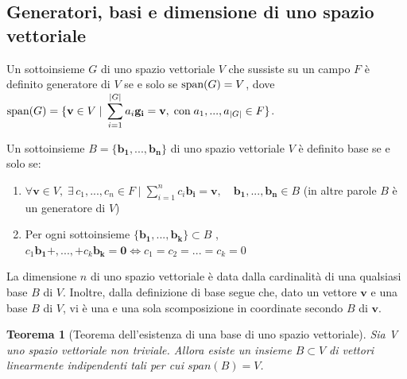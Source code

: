 \documentclass{article}
\newtheorem{theorem}{Teorema}
\begin{document}
\vspace{10pt}
\subsection{Generatori, basi e dimensione di uno spazio vettoriale}
    Un sottoinsieme $G$ di uno spazio vettoriale $V$ che sussiste su un campo $F$ è definito generatore di $V$ se e solo se $\textnormal{span}(G) = V$, dove $\textnormal{span}(G) = \{\mathbf{v} \in V \; | \; \displaystyle\sum_{i = 1}^{|G|} a_i \mathbf{g_i} = \mathbf{v}, \; \textnormal{con} \; a_1, ..., a_{|G|} \in F\}$.

    \vspace{10pt}
    Un sottoinsieme $B = \{\mathbf{b_1},...,\mathbf{b_n}\}$ di uno spazio vettoriale $V$ è definito base se e solo se:
    \begin{enumerate}[label=(\arabic*)]
        \item $ \forall \mathbf{v} \in V, \; \exists \, c_1, ..., c_n \in F \; | \; \displaystyle\sum_{i = 1}^{n} c_i \mathbf{b_i} = \mathbf{v}, \quad \mathbf{b_1}, ..., \mathbf{b_n} \in B$ (in altre parole $B$ è un generatore di $V$) 
        \item Per ogni sottoinsieme $\{\mathbf{b_1}, ..., \mathbf{b_k}\} \subset B$ , $c_1 \mathbf{b_1} + , ..., + c_k \mathbf{b_k} = \mathbf{0} \iff c_1 = c_2 = ... = c_k = 0 $  
    \end{enumerate}

    \vspace{5pt}
    La dimensione $n$ di uno spazio vettoriale è data dalla cardinalità di una qualsiasi base $B$ di $V$.
    Inoltre, dalla definizione di base segue che, dato un vettore $\mathbf{v}$ e una base $B$ di $V$, vi è una e una sola scomposizione in coordinate secondo $B$ di $\mathbf{v}$.

    \newpage
    \begin{theorem}[Teorema dell'esistenza di una base di uno spazio vettoriale]
        Sia V uno spazio vettoriale non triviale. Allora esiste un insieme $B \subset V$ di vettori linearmente indipendenti tali per cui $span(B) = V$.
    \end{theorem}
\end{document}

